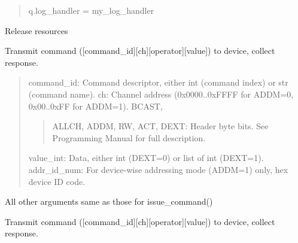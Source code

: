 \documentclass[letterpaper,10pt,english]{sphinxmanual}
\begin{document}
\begin{fulllineitems}
\begin{quote}
q.log\_handler = my\_log\_handler
\end{quote}

\begin{fulllineitems}
\label{\detokenize{qontrol:qontrol.Qontroller.close}}
Release resources

\end{fulllineitems}


\begin{fulllineitems}
\label{\detokenize{qontrol:qontrol.Qontroller.issue_binary_command}}
Transmit command ({[}command\_id{]}{[}ch{]}{[}operator{]}{[}value{]}) to device, collect response.
\begin{quote}

command\_id:             Command descriptor, either int (command index) or str (command name).
ch:                     Channel address (0x0000..0xFFFF for ADDM=0, 0x00..0xFF for ADDM=1).
BCAST,
\begin{quote}

ALLCH,
ADDM,
RW,
ACT,
DEXT:                  Header byte bits. See Programming Manual for full description.
\end{quote}

value\_int:              Data, either int (DEXT=0) or list of int (DEXT=1).
addr\_id\_num:    For device-wise addressing mode (ADDM=1) only, hex device ID code.
\end{quote}

All other arguments same as those for issue\_command()

\end{fulllineitems}


\begin{fulllineitems}
\label{\detokenize{qontrol:qontrol.Qontroller.issue_command}}
Transmit command ({[}command\_id{]}{[}ch{]}{[}operator{]}{[}value{]}) to device, collect response.
\begin{quote}


\end{quote}
\end{fulllineitems}
\end{fulllineitems}
\end{document}
